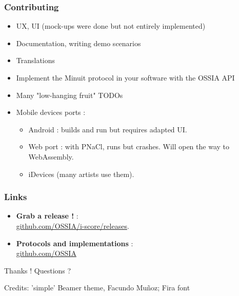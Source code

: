 \documentclass{beamer}
\begin{document}
\begin{frame}
    \frametitle{Contributing}    
    \begin{itemize}
    \item UX, UI (mock-ups were done but not entirely implemented)
    \item Documentation, writing demo scenarios
    \item Translations    
    \item Implement the Minuit protocol in your software with the OSSIA API    
    \item Many "low-hanging fruit" TODOs
    \item Mobile devices ports : 
    \begin{itemize}
        \item Android : builds and run but requires adapted UI.
        \item Web port : with PNaCl, runs but crashes. Will open the way to WebAssembly. 
        \item iDevices (many artists use them).
    \end{itemize}
\end{itemize}
    
\end{frame}



\begin{frame}
    \frametitle{Links}
    \begin{itemize}
        \item \textbf{Grab a release !} :~\\ \url{github.com/OSSIA/i-score/releases}. 
        \item \textbf{Protocols and implementations} :~\\
        \url{github.com/OSSIA}
    \end{itemize}
        
    \centering
    \vspace{2cm}
    \Large{Thanks ! Questions ?}
    \vspace{2cm}
    
    \small{Credits: 'simple' Beamer theme, Facundo Muñoz; Fira font}
\end{frame}    
\end{document}

